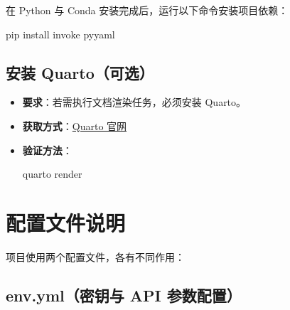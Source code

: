 \documentclass[
  letterpaper,
  DIV=11,
  numbers=noendperiod]{scrreprt}
\newenvironment{Shaded}{\begin{snugshade}}{\end{snugshade}}
\newcommand{\ExtensionTok}[1]{\textcolor[rgb]{0.00,0.23,0.31}{#1}}
\newcommand{\NormalTok}[1]{\textcolor[rgb]{0.00,0.23,0.31}{#1}}
\begin{document}
在 Python 与 Conda 安装完成后，运行以下命令安装项目依赖：

\begin{Shaded}
\begin{Highlighting}[]
\ExtensionTok{pip}\NormalTok{ install invoke pyyaml}
\end{Highlighting}
\end{Shaded}

\subsection{安装 Quarto（可选）}\label{ux5b89ux88c5-quartoux53efux9009}

\begin{itemize}
\item
  \textbf{要求}：若需执行文档渲染任务，必须安装 Quarto。\\
\item
  \textbf{获取方式}：\href{https://quarto.org/}{Quarto 官网}\\
\item
  \textbf{验证方法}：

\begin{Shaded}
\begin{Highlighting}[]
\ExtensionTok{quarto}\NormalTok{ render}
\end{Highlighting}
\end{Shaded}
\end{itemize}

\section{配置文件说明}\label{ux914dux7f6eux6587ux4ef6ux8bf4ux660e}

项目使用两个配置文件，各有不同作用：

\subsection{env.yml（密钥与 API
参数配置）}\label{env.ymlux5bc6ux94a5ux4e0e-api-ux53c2ux6570ux914dux7f6e}
\end{document}
